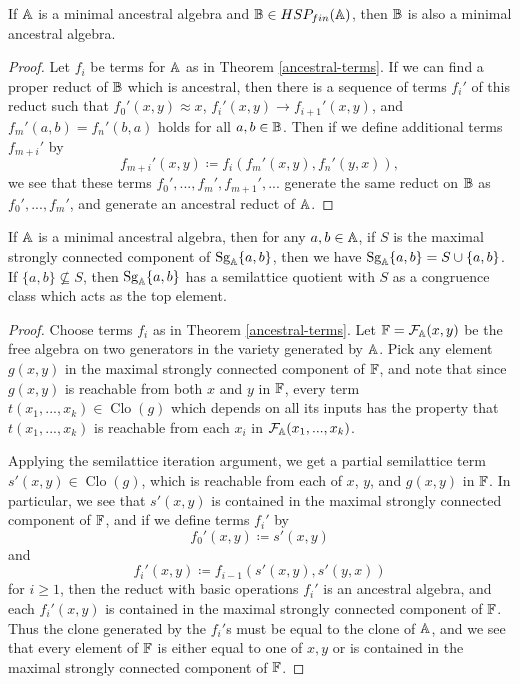 \documentclass[letterpaper,11pt]{article}
\DeclareMathOperator{\Clo}{Clo}
\DeclareMathOperator{\Sg}{Sg}
\begin{document}
\begin{prop} If $\mathbb{A}$ is a minimal ancestral algebra and $\mathbb{B} \in HSP_{fin}(\mathbb{A})$, then $\mathbb{B}$ is also a minimal ancestral algebra.
\end{prop}
\begin{proof} Let $f_i$ be terms for $\mathbb{A}$ as in Theorem \ref{ancestral-terms}. If we can find a proper reduct of $\mathbb{B}$ which is ancestral, then there is a sequence of terms $f_i'$ of this reduct such that $f_0'(x,y) \approx x$, $f_i'(x,y) \rightarrow f_{i+1}'(x,y)$, and $f_m'(a,b) = f_n'(b,a)$ holds for all $a,b \in \mathbb{B}$. Then if we define additional terms $f_{m+i}'$ by
\[
f_{m+i}'(x,y) \coloneqq f_i(f_m'(x,y), f_n'(y,x)),
\]
we see that these terms $f_0', ..., f_m', f_{m+1}', ...$ generate the same reduct on $\mathbb{B}$ as $f_0', ..., f_m'$, and generate an ancestral reduct of $\mathbb{A}$.
\end{proof}

\begin{thm}\label{ancestral-absorption} If $\mathbb{A}$ is a minimal ancestral algebra, then for any $a,b \in \mathbb{A}$, if $S$ is the maximal strongly connected component of $\Sg_\bA\{a,b\}$, then we have $\Sg_\bA\{a,b\} = S \cup \{a,b\}$. If $\{a,b\} \not\subseteq S$, then $\Sg_\bA\{a,b\}$ has a semilattice quotient with $S$ as a congruence class which acts as the top element.
\end{thm}
\begin{proof} Choose terms $f_i$ as in Theorem \ref{ancestral-terms}. Let $\mathbb{F} = \mathcal{F}_{\mathbb{A}}(x,y)$ be the free algebra on two generators in the variety generated by $\mathbb{A}$. Pick any element $g(x,y)$ in the maximal strongly connected component of $\mathbb{F}$, and note that since $g(x,y)$ is reachable from both $x$ and $y$ in $\mathbb{F}$, every term $t(x_1, ..., x_k) \in \Clo(g)$ which depends on all its inputs has the property that $t(x_1, ..., x_k)$ is reachable from each $x_i$ in $\mathcal{F}_{\mathbb{A}}(x_1, ..., x_k)$.

Applying the semilattice iteration argument, we get a partial semilattice term $s'(x,y) \in \Clo(g)$, which is reachable from each of $x$, $y$, and $g(x,y)$ in $\mathbb{F}$. In particular, we see that $s'(x,y)$ is contained in the maximal strongly connected component of $\mathbb{F}$, and if we define terms $f_i'$ by
\[
f_0'(x,y) \coloneqq s'(x,y)
\]
and
\[
f_i'(x,y) \coloneqq f_{i-1}(s'(x,y),s'(y,x))
\]
for $i \ge 1$, then the reduct with basic operations $f_i'$ is an ancestral algebra, and each $f_i'(x,y)$ is contained in the maximal strongly connected component of $\mathbb{F}$. Thus the clone generated by the $f_i'$s must be equal to the clone of $\mathbb{A}$, and we see that every element of $\mathbb{F}$ is either equal to one of $x,y$ or is contained in the maximal strongly connected component of $\mathbb{F}$.
\end{proof}
\end{document}
